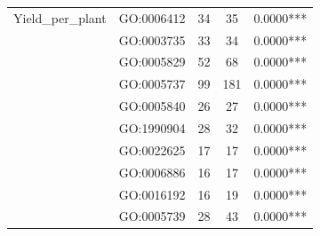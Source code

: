 \begin{table}[htbp]
\begin{tabular}{llccc}
Yield_per_plant & GO:0006412 & 34 & 35 & 0.0000*** \\
 & GO:0003735 & 33 & 34 & 0.0000*** \\
 & GO:0005829 & 52 & 68 & 0.0000*** \\
 & GO:0005737 & 99 & 181 & 0.0000*** \\
 & GO:0005840 & 26 & 27 & 0.0000*** \\
 & GO:1990904 & 28 & 32 & 0.0000*** \\
 & GO:0022625 & 17 & 17 & 0.0000*** \\
 & GO:0006886 & 16 & 17 & 0.0000*** \\
 & GO:0016192 & 16 & 19 & 0.0000*** \\
 & GO:0005739 & 28 & 43 & 0.0000*** \\
\bottomrule
\end{tabular}
\end{table}
